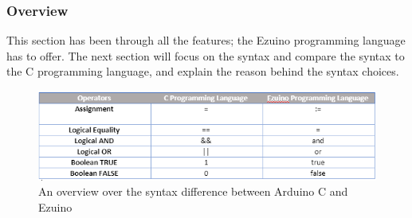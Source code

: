 \subsubsection{Overview}
This section has been through all the features; the Ezuino programming language has to offer. The next section will focus on the syntax and compare the syntax to the C programming language, and explain the reason behind the syntax choices.   
\begin{figure}[H]
\centering
\includegraphics[scale=0.80]{figures/language_features/Logical_assign_bool.PNG}
\caption{An overview over the syntax difference between Arduino C and Ezuino}
\label{syntax-overview}
\end{figure}